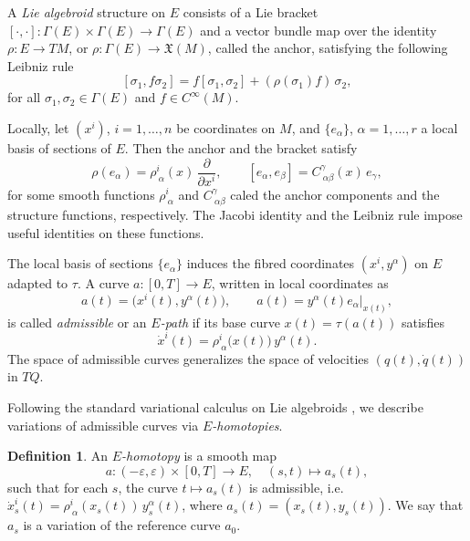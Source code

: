 \documentclass[11pt,a4paper]{article}
\theoremstyle{definition}
\newtheorem{definition}[theorem]{Definition}
\begin{document}
A \emph{Lie algebroid} structure on $E$ consists of a Lie bracket $[\cdot,\cdot]\colon \Gamma(E)\times\Gamma(E)\to\Gamma(E)$ and a vector bundle map over the identity $\rho\colon E\to TM$, or $\rho\colon \Gamma(E)\to \mathfrak{X}(M)$, called the anchor, satisfying the following Leibniz rule
\[
[\sigma_1, f\sigma_2] = f[\sigma_1,\sigma_2] + (\rho(\sigma_1)f)\,\sigma_2,
\]
for all $\sigma_1,\sigma_2\in\Gamma(E)$ and $f\in C^\infty(M)$.

Locally, let $(x^i)$, $i=1,\dots,n$ be coordinates on $M$, and 
$\{e_\alpha\}$, $\alpha=1,\dots,r$ a local basis of sections of $E$. Then the anchor and the bracket satisfy
\[
\rho(e_\alpha) = \rho^i_{\ \alpha}(x)\,\frac{\partial}{\partial x^i}, 
\qquad
[e_\alpha,e_\beta] = C^\gamma_{\ \alpha\beta}(x)\, e_\gamma,
\]
for some smooth functions $\rho^i_{\ \alpha}$ and
$C^\gamma_{\ \alpha\beta}$ caled the anchor components and the structure functions, respectively. The Jacobi identity and the
Leibniz rule impose useful identities on these functions.


The local basis of sections $\{e_{\alpha}\}$ induces the fibred coordinates $(x^{i},y^{\alpha})$ on $E$ adapted to $\tau$. A curve $a\colon [0,T] \to E$, written in local coordinates as
\[
a(t) = \big(x^i(t), y^\alpha(t)\big), \qquad
a(t) = y^\alpha(t) e_\alpha\big|_{x(t)},
\]
is called \emph{admissible} or an \textit{$E$-path} if its base curve $x(t)=\tau(a(t))$ satisfies
\begin{equation}\label{eq:admissible}
\dot x^i(t) = \rho^i_{\ \alpha}\big(x(t)\big)\, y^\alpha(t).
\end{equation}
The space of admissible curves generalizes the space of velocities
$(q(t),\dot q(t))$ in $TQ$.


Following the standard variational calculus on Lie algebroids \cite{martinez2008variational}, we describe
variations of admissible curves via \emph{$E$-homotopies}.

\begin{definition}
An \emph{$E$-homotopy} is a smooth map
\[
a \colon (-\varepsilon,\varepsilon)\times [0,T] \to E, \quad 
(s,t)\mapsto a_s(t),
\]
such that for each $s$, the curve $t\mapsto a_s(t)$ is admissible, i.e.
$\dot x_s^i(t)= \rho^i_{\ \alpha}(x_s(t))\,y_s^\alpha(t)$, where
$a_s(t) = (x_s(t),y_s(t))$.
We say that $a_s$ is a variation of the reference curve $a_0$.
\end{definition}
\end{document}
